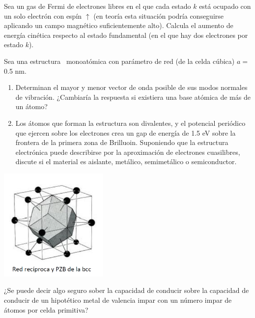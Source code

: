 \begin{ejercicio}
	Sea un gas de Fermi de electrones libres en el que cada estado $k$ está ocupado con un solo electrón con espín $\uparrow$ (en teoría esta situación podría conseguirse aplicando un campo magnético suficientemente alto). Calcula el aumento de energía cinética respecto al estado fundamental (en el que hay dos electrones por estado $k$).
\end{ejercicio}

\begin{ejercicio}
	Sea una estructura \bcc \ monoatómica con parámetro de red (de la celda cúbica) $a=$0.5 nm. 
	\begin{enumerate}[label=\alph*)]
		\item Determinan el mayor y menor vector de onda posible de sus modos normales de vibración. ¿Cambiaría la respuesta si existiera una base atómica de más de un átomo?
		\item Los átomos que forman la estructura son divalentes, y el potencial periódico que ejercen sobre los electrones crea un gap de energía de 1.5 eV sobre la frontera de la primera zona de Brilluoin. Suponiendo que la estructura electrónica puede describirse por la aproximación de electrones cuasilibres, discute si el material es aislante, metálico, semimetálico o semiconductor.
		
	\end{enumerate}
	
	\begin{center}
		\includegraphics[width=0.4\textwidth]{Imagenes/Enero_2021_03.png}
	\end{center}
	
\end{ejercicio}

\begin{ejercicio}
	¿Se puede decir algo seguro sober la capacidad de conducir sobre la capacidad de conducir de un hipotético metal de valencia impar con un número impar de átomos por celda primitiva?
\end{ejercicio}


